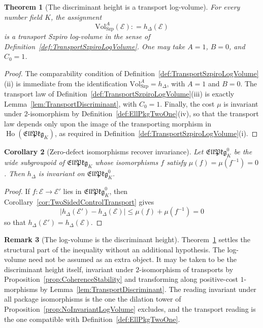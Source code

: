 \documentclass[10pt, reqno]{amsart}
\theoremstyle{plain}
\newtheorem{theorem}{Theorem}[section]
\newtheorem{corollary}[theorem]{Corollary}
\theoremstyle{definition}
\newtheorem{remark}[theorem]{Remark}
\theoremstyle{plain}
\newcommand{\Ho}{\operatorname{Ho}}
\newcommand{\coloneqq}{\mathrel{\mathop:}=}
\begin{document}
\begin{theorem}[The discriminant height is a transport log-volume]
\label{thm:DiscriminantHeightAsTransportLogVolume}
For every number field $K$, the assignment
\[
  \mathrm{Vol}^{A}_{\mathrm{Szp}}(\mathcal{E})
  \coloneqq
  h_\Delta(\mathcal{E})
\]
is a transport Szpiro log-volume in the sense of Definition~\ref{def:TransportSzpiroLogVolume}. One may take $A=1$, $B=0$, and $C_0=1$.
\end{theorem}

\begin{proof}
The comparability condition of Definition~\ref{def:TransportSzpiroLogVolume}\textup{(ii)} is immediate from the identification $\mathrm{Vol}^{A}_{\mathrm{Szp}}=h_\Delta$, with $A=1$ and $B=0$. The transport law of Definition~\ref{def:TransportSzpiroLogVolume}\textup{(iii)} is exactly Lemma~\ref{lem:TransportDiscriminant}, with $C_0=1$. Finally, the cost $\mu$ is invariant under $2$-isomorphism by Definition~\ref{def:EllPkgTwoOne}\textup{(iv)}, so that the transport law depends only upon the image of the transporting morphism in $\Ho(\mathfrak{EllPkg}_K)$, as required in Definition~\ref{def:TransportSzpiroLogVolume}\textup{(i)}.
\end{proof}

\begin{corollary}[Zero-defect isomorphisms recover invariance]\label{cor:ZeroDefectSubcategoryLogVolume}
Let $\mathfrak{EllPkg}_K^{0}$ be the wide subgroupoid of $\mathfrak{EllPkg}_K$ whose isomorphisms $f$ satisfy $\mu(f)=\mu(f^{-1})=0$. Then $h_\Delta$ is invariant on $\mathfrak{EllPkg}_K^{0}$.
\end{corollary}

\begin{proof}
If $f\colon\mathcal{E}\to\mathcal{E}'$ lies in $\mathfrak{EllPkg}_K^{0}$, then Corollary~\ref{cor:TwoSidedControlTransport} gives
\[
  \bigl|h_\Delta(\mathcal{E}')-h_\Delta(\mathcal{E})\bigr|
  \le
  \mu(f)+\mu(f^{-1})
  =
  0
\]
so that $h_\Delta(\mathcal{E}')=h_\Delta(\mathcal{E})$.
\end{proof}

\begin{remark}[The log-volume is the discriminant height]\label{rem:CorrectedLogVolumeDatum}
Theorem~\ref{thm:DiscriminantHeightAsTransportLogVolume} settles the structural part of the inequality without an additional hypothesis. The log-volume need not be assumed as an extra object. It may be taken to be the discriminant height itself, invariant under $2$-isomorphism of transports by Proposition~\ref{prop:CoherenceStability} and transforming along positive-cost $1$-morphisms by Lemma~\ref{lem:TransportDiscriminant}. The reading invariant under all package isomorphisms is the one the dilation tower of Proposition~\ref{prop:NoInvariantLogVolume} excludes, and the transport reading is the one compatible with Definition~\ref{def:EllPkgTwoOne}.
\end{remark}
\end{document}
